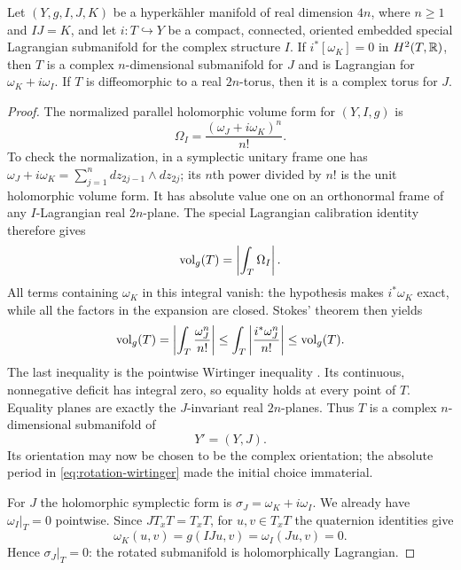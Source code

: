 \begin{lemma}
\label{lem:rotation-criterion}
Let $(Y,g,I,J,K)$ be a hyperk\"ahler manifold of real dimension $4n$,
where $n\ge1$ and $IJ=K$, and let $i:T\hookrightarrow Y$ be a compact,
connected, oriented embedded
special Lagrangian submanifold for the complex structure $I$.
If $i^*[\omega_K]=0$ in $H^2(T,\mathbb R)$, then $T$ is a complex
$n$-dimensional submanifold for $J$ and is Lagrangian for
$\omega_K+i\omega_I$. If $T$ is diffeomorphic to a real $2n$-torus,
then it is a complex torus for $J$.
\end{lemma}
\begin{proof}
The normalized parallel holomorphic volume form for $(Y,I,g)$ is
\[
                 \Omega_I=\frac{(\omega_J+i\omega_K)^n}{n!}.
\]
To check the normalization, in a symplectic unitary frame one has
$\omega_J+i\omega_K=\sum_{j=1}^n dz_{2j-1}\wedge dz_{2j}$;
its $n$th power divided by $n!$ is the unit holomorphic volume
form.  It has absolute value one on an orthonormal frame of any
$I$-Lagrangian real $2n$-plane. The special Lagrangian calibration identity
\cite[III.1, Theorem~1.10 and Corollary~1.11]{HarveyLawson}
therefore gives
\[
                    \operatorname{vol}_g(T)=\left|\int_T\Omega_I\right|.
\]
All terms containing $\omega_K$ in this integral vanish:
the hypothesis makes $i^*\omega_K$ exact,
while all the factors in the expansion are closed.  Stokes' theorem
then yields
\begin{equation}
 \operatorname{vol}_g(T)
 =\left|\int_T\frac{\omega_J^n}{n!}\right|
 \le\int_T\left|\frac{i^*\omega_J^n}{n!}\right|
 \le\operatorname{vol}_g(T).
\label{eq:rotation-wirtinger}
\end{equation}
The last inequality is the pointwise Wirtinger inequality
\cite[II.6, Theorem~6.11]{HarveyLawson}.
Its continuous, nonnegative deficit has integral zero, so equality
holds at every point of $T$.  Equality planes are exactly the
$J$-invariant real $2n$-planes.  Thus $T$ is a complex
$n$-dimensional submanifold of
\[
                              Y'=(Y,J).
\]
Its orientation may now be chosen to be the complex orientation;
the absolute period in \eqref{eq:rotation-wirtinger} made the
initial choice immaterial.

For $J$ the holomorphic symplectic form is
$\sigma_J=\omega_K+i\omega_I$.  We already have
$\omega_I|_T=0$ pointwise.  Since $JT_xT=T_xT$, for
$u,v\in T_xT$ the quaternion identities give
\[
              \omega_K(u,v)=g(IJu,v)=\omega_I(Ju,v)=0.
\]
Hence $\sigma_J|_T=0$: the rotated submanifold is holomorphically
Lagrangian.


\end{proof}
